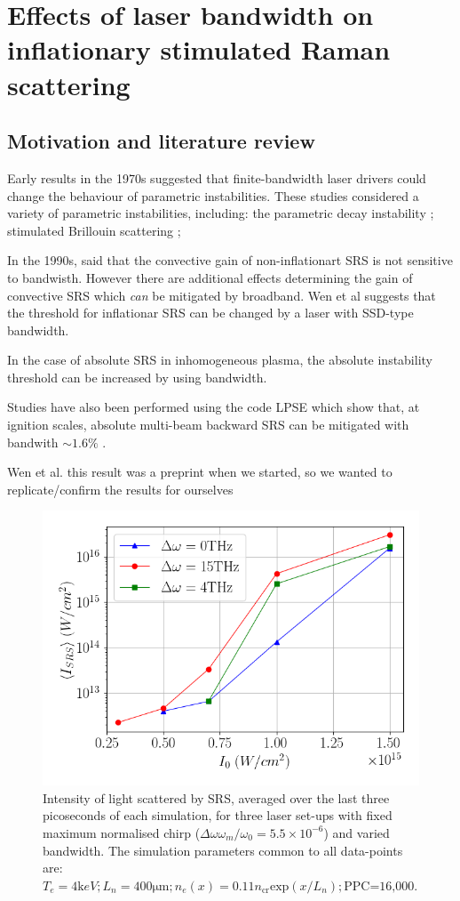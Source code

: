 \chapter{Effects of laser bandwidth on inflationary stimulated Raman scattering}
\label{chp:broadbandSRS}

\section{Motivation and literature review}

Early results in the 1970s suggested that finite-bandwidth laser drivers could change the behaviour of parametric instabilities. These studies considered a variety of parametric instabilities, including: the parametric decay instability \citep{Thomson1974}; stimulated Brillouin scattering \citep{Kruer1973};  

In the 1990s, \cite{Guzdar1991} said that the convective gain of non-inflationart SRS is not sensitive to bandwisth. However there are additional effects determining the gain of convective SRS which \emph{can} be mitigated by broadband. Wen et al suggests that the threshold for inflationar SRS can be changed by a laser with SSD-type bandwidth.

In the case of absolute SRS in inhomogeneous plasma, the absolute instability threshold can be increased by using bandwidth.


Studies have also been performed using the code LPSE which show that, at ignition scales, absolute multi-beam backward SRS can be mitigated with bandwith $\sim 1.6\%$ \citep{Follett2021}.


Wen et al. this result was a preprint when we started, so we wanted to replicate/confirm the results for ourselves 

\begin{figure}[ht]
   \centering
    \includegraphics[width=0.75\columnwidth]{Chapters/C5_broadband/bandwidth_no_dependence_Wen.png}
    \caption{Intensity of light scattered by SRS, averaged over the last three picoseconds of each simulation, for three laser set-ups with fixed maximum normalised chirp ($\Delta\omega \omega_m / \omega_0=5.5\times10^{-6}$) and varied bandwidth. The simulation parameters common to all data-points are: $T_e = 4\si{\kilo eV}; L_n = 400\si{\micro\metre}; n_e(x) = 0.11n_{\text{cr}}\text{exp}(x/L_n);\text{PPC=16,000}. $}
    \label{fig:Wenreplication}
\end{figure}{}


